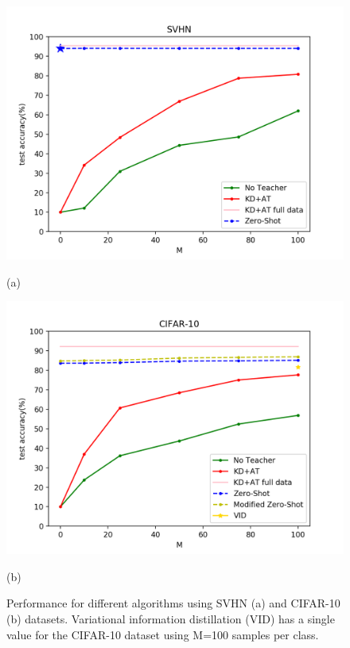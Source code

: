 \begin{figure}[H]
\centering
{}%
  \includegraphics[width=\linewidth]{images/svhn_performance.png}
  \caption*{(a)}
  
\endminipage
{}
  \includegraphics[width=\linewidth]{images/modified-cifar-performance.png}
  \caption*{(b)}
\endminipage\hfill

\caption{ Performance for different algorithms using SVHN (a) and CIFAR-10 (b) datasets. Variational information distillation (VID)\cite{Ahn2019VariationalID} has a single value for the CIFAR-10 dataset using M=100 samples per class.}
\label{fig:performance}
\end{figure}


